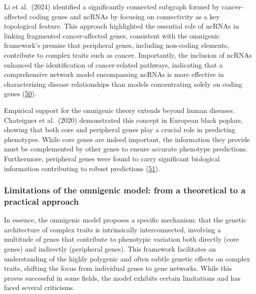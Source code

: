 Li et al.~(2024) identified a significantly connected subgraph formed by cancer-affected coding genes and ncRNAs by focusing on connectivity as a key topological feature.
This approach highlighted the essential role of ncRNAs in linking fragmented cancer-affected genes, consistent with the omnigenic framework's premise that peripheral genes, including non-coding elements, contribute to complex traits such as cancer.
Importantly, the inclusion of ncRNAs enhanced the identification of cancer-related pathways, indicating that a comprehensive network model encompassing ncRNAs is more effective in characterizing disease relationships than models concentrating solely on coding genes (\protect\hyperlink{ref-13VkGrWQR}{50}).

Empirical support for the omnigenic theory extends beyond human diseases.
Chateigner et al.~(2020) demonstrated this concept in European black poplars, showing that both core and peripheral genes play a crucial role in predicting phenotypes.
While core genes are indeed important, the information they provide must be complemented by other genes to ensure accurate phenotype predictions.
Furthermore, peripheral genes were found to carry significant biological information contributing to robust predictions (\protect\hyperlink{ref-EgquVUSg}{51}).

\hypertarget{limitations-of-the-omnigenic-model-from-a-theoretical-to-a-practical-approach}{%
\subsubsection{Limitations of the omnigenic model: from a theoretical to a practical approach}\label{limitations-of-the-omnigenic-model-from-a-theoretical-to-a-practical-approach}}

In essence, the omnigenic model proposes a specific mechanism: that the genetic architecture of complex traits is intrinsically interconnected, involving a multitude of genes that contribute to phenotypic variation both directly (core genes) and indirectly (peripheral genes).
This framework facilitates an understanding of the highly polygenic and often subtle genetic effects on complex traits, shifting the focus from individual genes to gene networks.
While this proves successful in some fields, the model exhibits certain limitations and has faced several criticisms.

